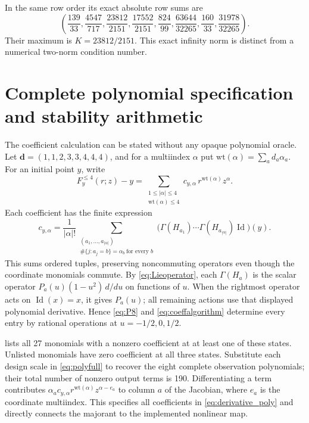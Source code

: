 \documentclass[11pt,a4paper]{article}
\numberwithin{equation}{section}
\theoremstyle{definition}
\theoremstyle{remark}
\DeclareMathOperator{\Id}{Id}
\begin{document}
In the same row order its exact absolute row sums are
\begin{equation}\label{eq:invrows}
 \left(\frac{139}{33},\frac{4547}{717},\frac{23812}{2151},
 \frac{17552}{2151},\frac{824}{99},\frac{63644}{32265},
 \frac{160}{33},\frac{31978}{32265}\right).
\end{equation}
Their maximum is $K=23812/2151$. This exact infinity norm is distinct
from a numerical two-norm condition number.

\section{Complete polynomial specification and stability arithmetic}
\label{app:polynomial}
The coefficient calculation can be stated without any opaque polynomial
oracle. Let $\mathbf d=(1,1,2,3,3,4,4,4)$, and for a multiindex $\alpha$
put $\mathrm{wt}(\alpha)=\sum_a d_a\alpha_a$. For an initial point $y$,
write
\begin{equation}\label{eq:polyfull}
 F_y^{\leq4}(r;z)-y
 =\sum_{\substack{1\leq|\alpha|\leq4\\\mathrm{wt}(\alpha)\leq4}}
 c_{y,\alpha}\,r^{\mathrm{wt}(\alpha)}z^\alpha.
\end{equation}
Each coefficient has the finite expression
\begin{equation}\label{eq:coeffalgorithm}
 c_{y,\alpha}=\frac1{|\alpha|!}
 \sum_{\substack{(a_1,\ldots,a_{|\alpha|})\\
 \#\{j:a_j=b\}=\alpha_b\ \text{for every }b}}
 \bigl(\Gamma(H_{a_1})\cdots\Gamma(H_{a_{|\alpha|}})\Id\bigr)(y).
\end{equation}
This sums ordered tuples, preserving noncommuting operators even though
the coordinate monomials commute. By \eqref{eq:Lieoperator}, each
$\Gamma(H_a)$ is the scalar operator
$P_a(u)(1-u^2)\,d/du$ on functions of $u$. When the rightmost operator
acts on $\Id(x)=x$, it gives $P_a(u)$; all remaining actions use that
displayed polynomial derivative. Hence \eqref{eq:P8} and
\eqref{eq:coeffalgorithm} determine every entry by rational operations
at $u=-1/2,0,1/2$.

 lists all 27 monomials with a nonzero coefficient
at at least one of these states. Unlisted monomials have zero coefficient
at all three states. Substitute each design scale in \eqref{eq:polyfull}
to recover the eight complete observation polynomials; their total number
of nonzero output terms is 190. Differentiating a term contributes
$\alpha_a c_{y,\alpha}r^{\mathrm{wt}(\alpha)}z^{\alpha-e_a}$ to column
$a$ of the Jacobian, where $e_a$ is the coordinate multiindex. This
specifies all coefficients in \eqref{eq:derivative_poly} and directly
connects the majorant to the implemented nonlinear map.
\end{document}
